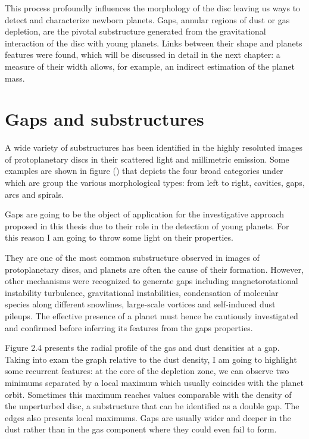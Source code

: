 \documentclass[a4paper,10pt]{report}
\begin{document}
This process profoundly influences the morphology of the disc leaving us ways to detect and characterize newborn planets. 
Gaps, annular regions of dust or gas depletion, are the pivotal substructure generated from the gravitational interaction of the disc with young planets.
Links between their shape and planets features were found, which will be discussed in detail in the next chapter:
a measure of their width allows, for example, an indirect estimation of the planet mass.

\section{Gaps and substructures}

A wide variety of substructures has been identified in the highly resoluted images
of protoplanetary discs in their scattered light and millimetric emission. Some examples are shown 
in figure () that depicts the four broad categories under which are group the various morphological types:
from left to right, cavities, gaps, arcs and spirals.

Gaps are going to be the object of application for the investigative approach proposed in this thesis due
to their role in the detection of young planets.
For this reason I am going to throw some light on their properties.

They are one of the most common substructure observed in images of protoplanetary discs, and
planets are often the cause of their formation. However, other mechanisms were recognized to generate gaps
including magnetorotational instability turbulence, gravitational instabilities, condensation of molecular species along different snowlines,
large-scale vortices and self-induced dust pileups. The effective presence of a planet must hence be cautiously investigated and confirmed 
before inferring its features from the gaps properties. 

Figure 2.4 presents the radial profile of the gas and dust densities at a gap. Taking into exam 
the graph relative to the dust density, I am going to highlight some recurrent features:
at the core of the depletion zone, we can observe two minimums separated by a local maximum which usually coincides with the planet orbit.
Sometimes this maximum reaches values comparable with the density of the unperturbed disc, a substructure that can be identified as a double gap. 
The edges also presents local maximums. Gaps are usually wider and deeper in the dust rather than in the gas component where they could even
fail to form.
\end{document}
